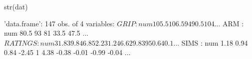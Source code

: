 \begin{Schunk}
\begin{Sinput}
 str(dat)
\end{Sinput}
\begin{Soutput}
'data.frame':	147 obs. of  4 variables:
 $ GRIP   : num  105.5 106.5 94 90.5 104 ...
 $ ARM    : num  80.5 93 81 33.5 47.5 ...
 $ RATINGS: num  31.8 39.8 46.8 52.2 31.2 46.6 29.8 39 50.6 40.1 ...
 $ SIMS   : num  1.18 0.94 0.84 -2.45 1 4.38 -0.38 -0.01 -0.99 -0.04 ...
\end{Soutput}
\end{Schunk}
